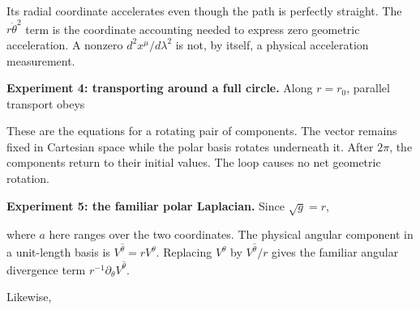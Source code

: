 \documentclass[
  11pt,
  letterpaper,
  oneside,
  openany]{scrbook}
\begin{document}
\begin{center}
\begingroup
{}
\ifdim\wd\grmathbox>\linewidth
\resizebox{\linewidth}{!}{\usebox{\grmathbox}}
\else\usebox{\grmathbox}\fi
\endgroup
\end{center}

Its radial coordinate accelerates even though the path is perfectly
straight. The \(r\dot\theta^2\) term is the coordinate accounting needed
to express zero geometric acceleration. A nonzero
\(d^2x^\mu/d\lambda^2\) is not, by itself, a physical acceleration
measurement.

\textbf{Experiment 4: transporting around a full circle.} Along
\(r=r_0\), parallel transport obeys

\begin{center}
\begingroup
{}
\ifdim\wd\grmathbox>\linewidth
\resizebox{\linewidth}{!}{\usebox{\grmathbox}}
\else\usebox{\grmathbox}\fi
\endgroup
\end{center}

These are the equations for a rotating pair of components. The vector
remains fixed in Cartesian space while the polar basis rotates
underneath it. After \(2\pi\), the components return to their initial
values. The loop causes no net geometric rotation.

\textbf{Experiment 5: the familiar polar Laplacian.} Since
\(\sqrt{g}=r\),

\begin{center}
\begingroup
{}
\ifdim\wd\grmathbox>\linewidth
\resizebox{\linewidth}{!}{\usebox{\grmathbox}}
\else\usebox{\grmathbox}\fi
\endgroup
\end{center}

where \(a\) here ranges over the two coordinates. The physical angular
component in a unit-length basis is \(V^{\hat\theta}=rV^\theta\).
Replacing \(V^\theta\) by \(V^{\hat\theta}/r\) gives the familiar
angular divergence term \(r^{-1}\partial_\theta V^{\hat\theta}\).

Likewise,

\begin{center}
\begingroup
{}
\ifdim\wd\grmathbox>\linewidth
\resizebox{\linewidth}{!}{\usebox{\grmathbox}}
\else\usebox{\grmathbox}\fi
\endgroup
\end{center}
\end{document}
